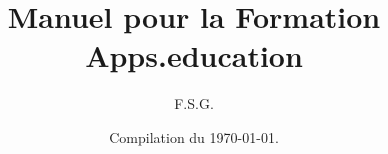 \documentclass[a4paper, 11pt]{book}
\title{Manuel pour la Formation\\ Apps.education}
\author{F.S.G.}
\date{Compilation du \today{}.}
\renewcommand{\baselinestretch}{1.25}
\begin{document}
\begin{titlepage}
    \maketitle
\end{titlepage}

















\setcounter{chapter}{0}
\renewcommand{\chaptername}{Fiche}
\renewcommand{\thechapter}{\Alph{chapter}}



\newpage
\renewcommand{\baselinestretch}{1}
\setlength{\parskip}{0em}
\tableofcontents

\listoffigures
\end{document}
